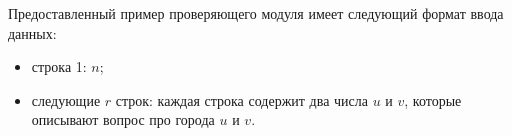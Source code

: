 Предоставленный пример проверяющего модуля имеет следующий формат ввода данных:
\begin{itemize}
\item строка 1: $n$;
\item следующие $r$ строк: каждая строка содержит два числа $u$ и $v$, которые описывают вопрос про города $u$ и $v$.
\end{itemize}
